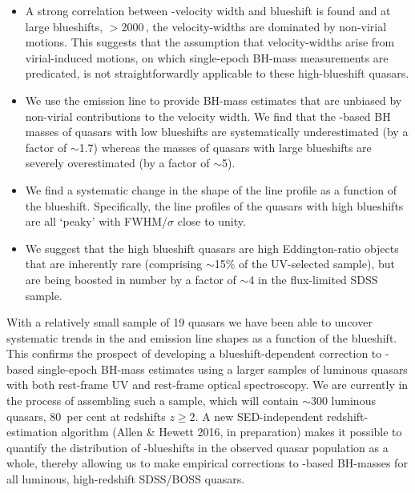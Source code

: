 \begin{itemize}

\item{A strong correlation between -velocity width and blueshift is found and at large blueshifts, $>$2000\,\kms, the velocity-widths are dominated by non-virial motions. 
This suggests that the assumption that velocity-widths arise from virial-induced motions, on which single-epoch BH-mass measurements are predicated, is not straightforwardly applicable to these high-blueshift quasars.}

\item{We use the \ha emission line to provide BH-mass estimates that are unbiased by non-virial contributions to the velocity width. 
We find that the -based BH masses of quasars with low  blueshifts are systematically underestimated (by a factor of $\sim$1.7) whereas the masses of quasars with large blueshifts are severely overestimated (by a factor of $\sim$5).} 

\item{We find a systematic change in the shape of the \ha line profile as a function of the  blueshift. 
Specifically, the \ha line profiles of the quasars with high  blueshifts are all `peaky' with FWHM/$\sigma$ close to unity.} 

\item{We suggest that the high  blueshift quasars are high Eddington-ratio objects that are inherently rare (comprising $\sim$15\% of the UV-selected sample), but are being boosted in number by a factor of $\sim$4 in the flux-limited SDSS sample.}

\end{itemize}

With a relatively small sample of 19 quasars we have been able to uncover systematic trends in the  and \ha emission line shapes as a function of the  blueshift.
This confirms the prospect of developing a blueshift-dependent correction to -based single-epoch BH-mass estimates using a larger samples of luminous quasars with both rest-frame UV and rest-frame optical spectroscopy. 
We are currently in the process of assembling such a sample, which will contain $\sim$300 luminous quasars, 80\, per cent at redshifts $z\geq$2.    
A new SED-independent redshift-estimation algorithm (Allen \& Hewett 2016, in preparation) makes it possible to quantify the distribution of -blueshifts in the observed quasar population as a whole, thereby allowing us to make empirical corrections to -based BH-masses for all luminous, high-redshift SDSS/BOSS quasars.


